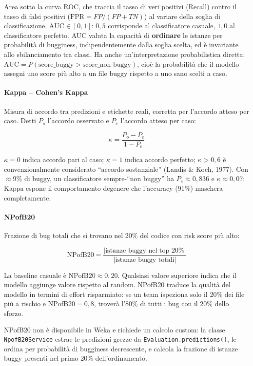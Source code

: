 Area sotto la curva ROC, che traccia il tasso di veri positivi (Recall) contro il tasso
di falsi positivi ($\text{FPR} = FP/(FP+TN)$) al variare della soglia di classificazione.
$\text{AUC} \in [0,1]$: $0{,}5$ corrisponde al classificatore casuale, $1{,}0$ al
classificatore perfetto. AUC valuta la capacità di \textbf{ordinare} le istanze per
probabilità di bugginess, indipendentemente dalla soglia scelta, ed è invariante allo
sbilanciamento tra classi. Ha anche un'interpretazione probabilistica diretta:
$\text{AUC} = P(\text{score\_buggy} > \text{score\_non-buggy})$, cioè la probabilità
che il modello assegni uno score più alto a un file buggy rispetto a uno sano scelti a caso.

\paragraph{Kappa -- Cohen's Kappa}

Misura di accordo tra predizioni e etichette reali, corretta per l'accordo atteso per
caso. Detti $P_o$ l'accordo osservato e $P_e$ l'accordo atteso per caso:

\[
\kappa = \frac{P_o - P_e}{1 - P_e}
\]

$\kappa = 0$ indica accordo pari al caso; $\kappa = 1$ indica accordo perfetto;
$\kappa > 0{,}6$ è convenzionalmente considerato ``accordo sostanziale'' (Landis \& Koch,
1977). Con $\approx$9\% di buggy, un classificatore sempre-``non buggy'' ha
$P_e \approx 0{,}836$ e $\kappa \approx 0{,}07$: Kappa espone il comportamento degenere
che l'accuracy ($91\%$) maschera completamente.

\paragraph{NPofB20}

Frazione di bug totali che si trovano nel 20\% del codice con risk score più alto:

\[
\text{NPofB20} = \frac{|\text{istanze buggy nel top }20\%|}{|\text{istanze buggy totali}|}
\]

La baseline casuale è $\text{NPofB20} \approx 0{,}20$. Qualsiasi valore superiore indica
che il modello aggiunge valore rispetto al random. NPofB20 traduce la qualità del modello
in termini di effort risparmiato: se un team ispeziona solo il 20\% dei file più a rischio
e $\text{NPofB20} = 0{,}8$, troverà l'80\% di tutti i bug con il 20\% dello sforzo.

NPofB20 non è disponibile in Weka e richiede un calcolo custom: la classe
\texttt{NpofB20Service} estrae le predizioni grezze da \texttt{Evaluation.predictions()},
le ordina per probabilità di bugginess decrescente, e calcola la frazione di istanze buggy
presenti nel primo 20\% dell'ordinamento.

